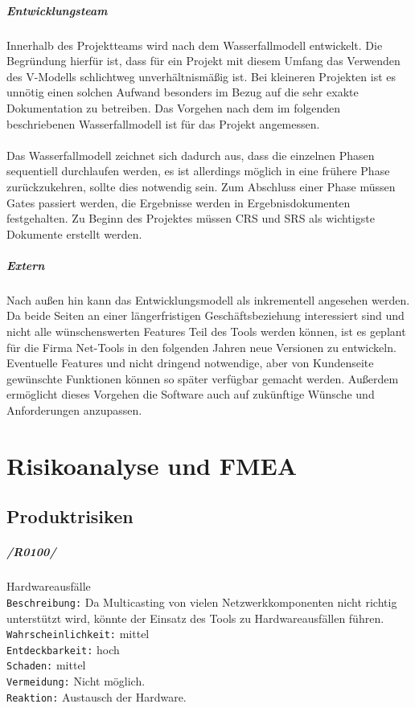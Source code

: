 \paragraph {Entwicklungsteam}
Innerhalb des Projektteams wird nach dem Wasserfallmodell entwickelt. Die
Begründung hierfür ist, dass für ein Projekt mit diesem Umfang das Verwenden des
V-Modells schlichtweg unverhältnismäßig ist. Bei kleineren Projekten ist es
unnötig einen solchen Aufwand besonders im Bezug auf die sehr exakte
Dokumentation zu betreiben. Das Vorgehen nach dem im folgenden
beschriebenen Wasserfallmodell ist für das Projekt angemessen.\\
\\
Das Wasserfallmodell zeichnet sich dadurch aus, dass die einzelnen Phasen
sequentiell durchlaufen werden, es ist allerdings möglich in eine frühere Phase
zurückzukehren, sollte dies notwendig sein. Zum Abschluss einer Phase müssen
Gates passiert werden, die Ergebnisse werden in Ergebnisdokumenten
festgehalten. Zu Beginn des Projektes müssen CRS und SRS als wichtigste Dokumente erstellt
werden.

\paragraph{Extern}
Nach außen hin kann das Entwicklungsmodell als inkrementell angesehen werden. Da
beide Seiten an einer längerfristigen Geschäftsbeziehung interessiert sind und
nicht alle wünschenswerten Features Teil des Tools werden können, ist es geplant für die
Firma Net-Tools in den folgenden Jahren neue Versionen zu entwickeln. Eventuelle
Features und nicht dringend notwendige, aber von Kundenseite gewünschte
Funktionen können so später verfügbar gemacht werden. Außerdem ermöglicht
dieses Vorgehen die Software auch auf zukünftige Wünsche und Anforderungen
anzupassen.

\chapter{Risikoanalyse und FMEA}
\label{cha:risi}

\section{Produktrisiken}
\label{sec:prorisk}

\paragraph{/R0100/}Hardwareausfälle \\
\texttt{Beschreibung:} Da Multicasting von vielen Netzwerkkomponenten nicht richtig unterstützt wird, könnte der Einsatz des Tools zu Hardwareausfällen führen.\\
\texttt{Wahrscheinlichkeit:} mittel\\
\texttt{Entdeckbarkeit:} hoch\\
\texttt{Schaden:} mittel\\
\texttt{Vermeidung:} Nicht möglich.\\
\texttt{Reaktion:} Austausch der Hardware.\\

